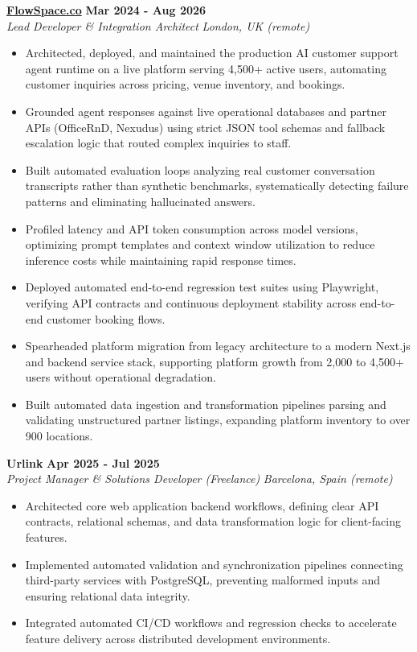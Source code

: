 \documentclass[10pt,a4paper]{article}
\newcommand{\role}[4]{%
  \textbf{#1} \hfill \textbf{#2}\\[1pt]%
  \textit{#3} \hfill \textit{#4}\\[2pt]%
}
\begin{document}
\role{\href{https://flowspace.co}{FlowSpace.co}}{Mar 2024 - Aug 2026}{Lead Developer \& Integration Architect}{London, UK (remote)}
\begin{itemize}
  \item Architected, deployed, and maintained the production AI customer support agent runtime on a live platform serving 4,500+ active users, automating customer inquiries across pricing, venue inventory, and bookings.
  \item Grounded agent responses against live operational databases and partner APIs (OfficeRnD, Nexudus) using strict JSON tool schemas and fallback escalation logic that routed complex inquiries to staff.
  \item Built automated evaluation loops analyzing real customer conversation transcripts rather than synthetic benchmarks, systematically detecting failure patterns and eliminating hallucinated answers.
  \item Profiled latency and API token consumption across model versions, optimizing prompt templates and context window utilization to reduce inference costs while maintaining rapid response times.
  \item Deployed automated end-to-end regression test suites using Playwright, verifying API contracts and continuous deployment stability across end-to-end customer booking flows.
  \item Spearheaded platform migration from legacy architecture to a modern Next.js and backend service stack, supporting platform growth from 2,000 to 4,500+ users without operational degradation.
  \item Built automated data ingestion and transformation pipelines parsing and validating unstructured partner listings, expanding platform inventory to over 900 locations.
\end{itemize}

\role{Urlink}{Apr 2025 - Jul 2025}{Project Manager \& Solutions Developer (Freelance)}{Barcelona, Spain (remote)}
\begin{itemize}
  \item Architected core web application backend workflows, defining clear API contracts, relational schemas, and data transformation logic for client-facing features.
  \item Implemented automated validation and synchronization pipelines connecting third-party services with PostgreSQL, preventing malformed inputs and ensuring relational data integrity.
  \item Integrated automated CI/CD workflows and regression checks to accelerate feature delivery across distributed development environments.
\end{itemize}
\end{document}
